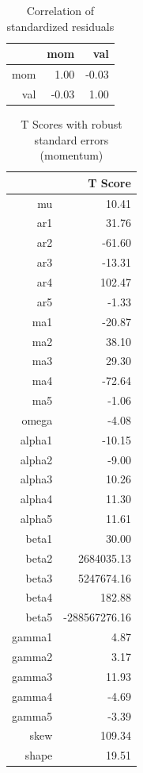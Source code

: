 \documentclass[11pt,letterpaper]{memoir}
\begin{document}
\begin{table}[ht]
\centering
\caption{Correlation of standardized residuals}
\begin{tabular}{rrr}
  \hline
 & mom & val \\ 
  \hline
mom & 1.00 & -0.03 \\ 
  val & -0.03 & 1.00 \\ 
   \hline
\end{tabular}
\end{table}
\begin{table}[ht]
\centering
\caption{T Scores with robust standard errors (momentum)}
\begin{tabular}{rr}
  \hline
 & T Score \\ 
  \hline
mu & 10.41 \\ 
  ar1 & 31.76 \\ 
  ar2 & -61.60 \\ 
  ar3 & -13.31 \\ 
  ar4 & 102.47 \\ 
  ar5 & -1.33 \\ 
  ma1 & -20.87 \\ 
  ma2 & 38.10 \\ 
  ma3 & 29.30 \\ 
  ma4 & -72.64 \\ 
  ma5 & -1.06 \\ 
  omega & -4.08 \\ 
  alpha1 & -10.15 \\ 
  alpha2 & -9.00 \\ 
  alpha3 & 10.26 \\ 
  alpha4 & 11.30 \\ 
  alpha5 & 11.61 \\ 
  beta1 & 30.00 \\ 
  beta2 & 2684035.13 \\ 
  beta3 & 5247674.16 \\ 
  beta4 & 182.88 \\ 
  beta5 & -288567276.16 \\ 
  gamma1 & 4.87 \\ 
  gamma2 & 3.17 \\ 
  gamma3 & 11.93 \\ 
  gamma4 & -4.69 \\ 
  gamma5 & -3.39 \\ 
  skew & 109.34 \\ 
  shape & 19.51 \\ 
   \hline
\end{tabular}
\end{table}
\end{document}
